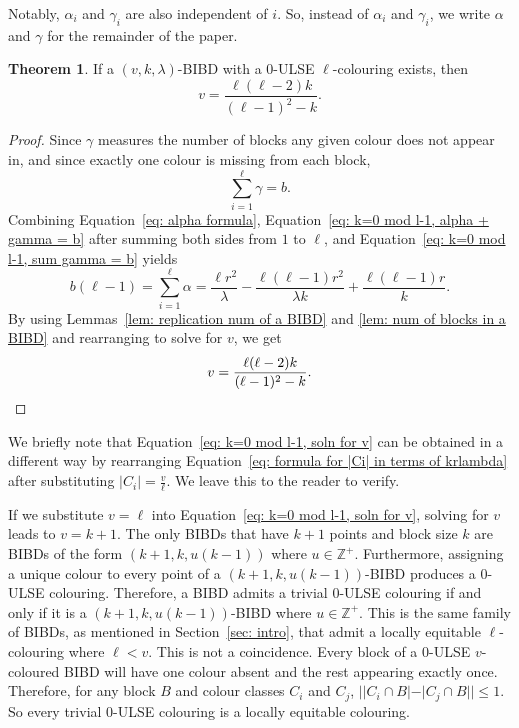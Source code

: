 \documentclass[12pt]{article}
\theoremstyle{definition}
\newtheorem{theorem}{Theorem}[section]
\begin{document}
Notably, $\alpha_i$ and $\gamma_i$ are also independent of $i$. So, instead of $\alpha_i$ and $\gamma_i$, we write $\alpha$ and $\gamma$ for the remainder of the paper. 

\begin{theorem}\label{thm: strong necessary condition for 0-LSE ell-col with ell-1 | k}
    If a $(v,k,\lambda)$-BIBD with a $0$-ULSE $\ell$-colouring exists, then 
    \begin{equation}\label{eq: k=0 mod l-1, soln for v}
        v = \frac{\ell(\ell - 2)k}{(\ell-1)^2- k}.
    \end{equation}
\end{theorem}

\begin{proof}
Since $\gamma$ measures the number of blocks any given colour does not appear in, and since exactly one colour is missing from each block, 
\begin{equation}\label{eq: k=0 mod l-1, sum gamma = b}
    \sum_{i=1}^\ell \gamma = b.
\end{equation}
Combining Equation~\eqref{eq: alpha formula}, Equation~\eqref{eq: k=0 mod l-1, alpha + gamma = b} after summing both sides from $1$ to $\ell$, and Equation~\eqref{eq: k=0 mod l-1, sum gamma = b} yields 
\[b(\ell - 1) = \sum_{i=1}^\ell \alpha = \frac{\ell r^2}{\lambda} - \frac{\ell(\ell - 1) r^2}{\lambda k} + \frac{\ell(\ell - 1)r}{k}.\]
By using Lemmas~\ref{lem: replication num of a BIBD} and \ref{lem: num of blocks in a BIBD} and rearranging to solve for $v$, we get
\begin{equation*}
    v = \frac{\ell(\ell - 2)k}{(\ell - 1)^2 - k}. \qedhere
\end{equation*}
\end{proof}

We briefly note that Equation~\eqref{eq: k=0 mod l-1, soln for v} can be obtained in a different way by rearranging Equation~\eqref{eq: formula for |Ci| in terms of krlambda} after substituting $|C_i| = \frac{v}{\ell}$. We leave this to the reader to verify.

If we substitute $v = \ell$ into Equation~\eqref{eq: k=0 mod l-1, soln for v}, solving for $v$ leads to $v = k+1$. The only BIBDs that have $k+1$ points and block size $k$ are BIBDs of the form $(k+1, k, u(k-1))$ where $u \in \mathbb{Z}^+$. Furthermore, assigning a unique colour to every point of a $(k+1, k, u(k-1))$-BIBD produces a $0$-ULSE colouring. Therefore, a BIBD admits a trivial $0$-ULSE colouring if and only if it is a $(k+1, k, u(k-1))$-BIBD where $u\in \mathbb{Z}^+$. This is the same family of BIBDs, as mentioned in Section~\ref{sec: intro}, that admit a locally equitable $\ell$-colouring where $\ell < v$. This is not a coincidence. Every block of a $0$-ULSE $v$-coloured BIBD will have one colour absent and the rest appearing exactly once. Therefore, for any block $B$ and colour classes $C_i$ and $C_j$, $||C_i \cap B| - |C_j \cap B|| \leq 1$. So every trivial $0$-ULSE colouring is a locally equitable colouring.
\end{document}
